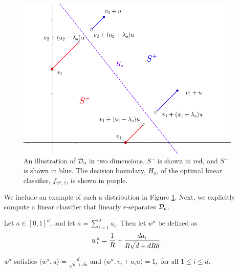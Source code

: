\begin{figure}[h]
\vspace{.3in}
\includegraphics[scale=0.5]{d_a_pic}
\vspace{.3in}
\caption{An illustration of ${\mathcal D}_a$ in two dimensions. $S^-$ is shown in red, and $S^+$ is shown in blue. The decision boundary, $H_a$, of the optimal linear classifier, $f_{w^a, 1}$, is shown in purple. }
\label{fig:d_a_illustration}
\end{figure}

We include an example of such a distribution in Figure \ref{fig:d_a_illustration}. Next, we explicitly compute a linear classifier that linearly $r$-separates ${\mathcal D}_a$.

\begin{defn}\label{def:normal_vector}
Let $a \in [0,1]^d$, and let $\overline{a} = \sum_{i=1}^d a_i.$ Then let $w^a$ be defined as $$w_i^a = \frac{1}{R} - \frac{da_i}{R\sqrt{d} + dR\overline{a}}.$$ 
\end{defn}

\begin{lem}\label{lem:normal_vector_works}
$w^a$ satisfies $\langle w^a, u\rangle = \frac{d}{\sqrt{d} + d\overline{a}}$ and $\langle w^a, v_i + a_iu \rangle = 1,$ for all $1 \leq i \leq d.$ 
\end{lem}

